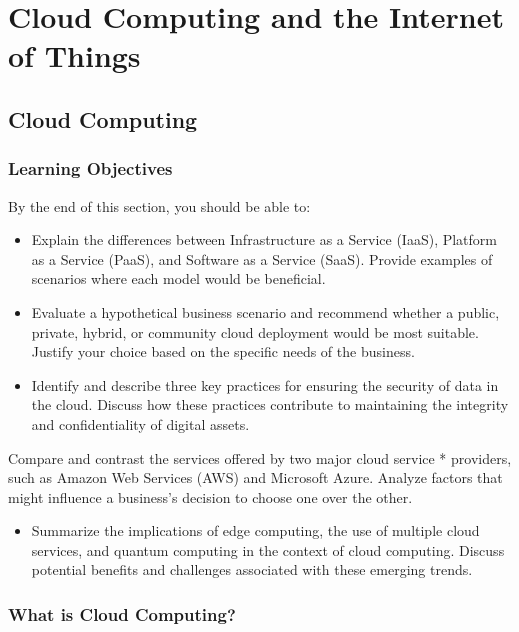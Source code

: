 \documentclass[
  letterpaper,
  DIV=11,
  numbers=noendperiod]{scrreprt}
\providecommand{\tightlist}{%
  \setlength{\itemsep}{0pt}\setlength{\parskip}{0pt}}\usepackage{longtable,booktabs,array}
\begin{document}

\chapter{Cloud Computing and the Internet of
Things}\label{cloud-computing-and-the-internet-of-things}

\section{Cloud Computing}\label{cloud-computing}

\subsection{Learning Objectives}\label{learning-objectives-2}

By the end of this section, you should be able to:

\begin{itemize}
\item
  Explain the differences between Infrastructure as a Service (IaaS),
  Platform as a Service (PaaS), and Software as a Service (SaaS).
  Provide examples of scenarios where each model would be beneficial.
\item
  Evaluate a hypothetical business scenario and recommend whether a
  public, private, hybrid, or community cloud deployment would be most
  suitable. Justify your choice based on the specific needs of the
  business.
\item
  Identify and describe three key practices for ensuring the security of
  data in the cloud. Discuss how these practices contribute to
  maintaining the integrity and confidentiality of digital assets.
\end{itemize}

Compare and contrast the services offered by two major cloud service *
providers, such as Amazon Web Services (AWS) and Microsoft Azure.
Analyze factors that might influence a business's decision to choose one
over the other.

\begin{itemize}
\tightlist
\item
  Summarize the implications of edge computing, the use of multiple
  cloud services, and quantum computing in the context of cloud
  computing. Discuss potential benefits and challenges associated with
  these emerging trends.
\end{itemize}

\subsection{What is Cloud Computing?}\label{what-is-cloud-computing}
\end{document}
